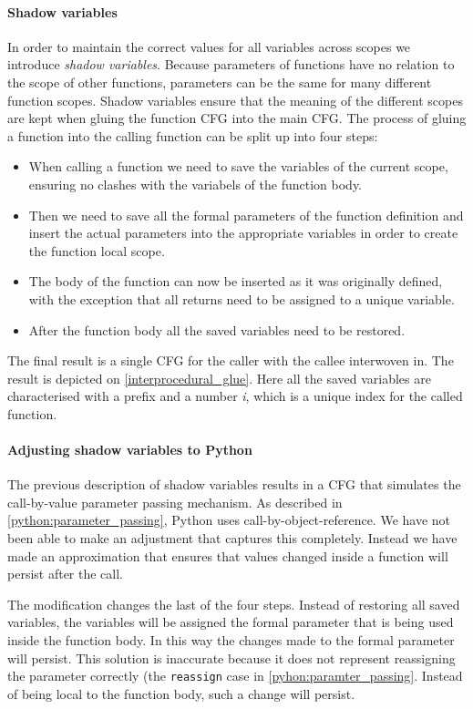 \paragraph{Shadow variables}
In order to maintain the correct values for all variables across scopes we introduce \emph{shadow variables}.
Because parameters of functions have no relation to the scope of other functions, parameters can be the same for many different function scopes.
Shadow variables ensure that the meaning of the different scopes are kept when gluing the function CFG into the main CFG.
The process of gluing a function into the calling function can be split up into four steps:
\begin{itemize}
\item When calling a function we need to save the variables of the current scope, ensuring no clashes with the variabels of the function body.
\item Then we need to save all the formal parameters of the function definition and insert the actual parameters into the appropriate variables in order to create the function local scope.
\item The body of the function can now be inserted as it was originally defined, with the exception that all returns need to be assigned to a unique variable.
\item After the function body all the saved variables need to be restored.
\end{itemize}

The final result is a single CFG for the caller with the callee interwoven in.
The result is depicted on \cref{interprocedural_glue}.
Here all the saved variables are characterised with a prefix and a number \emph{i}, which is a unique index for the called function.

\paragraph{Adjusting shadow variables to Python}
The previous description of shadow variables results in a CFG that simulates the call-by-value parameter passing mechanism.
As described in \cref{python:parameter_passing}, Python uses call-by-object-reference.
We have not been able to make an adjustment that captures this completely.
Instead we have made an approximation that ensures that values changed inside a function will persist after the call.

The modification changes the last of the four steps.
Instead of restoring all saved variables, the variables will be assigned the formal parameter that is being used inside the function body.
In this way the changes made to the formal parameter will persist.
This solution is inaccurate because it does not represent reassigning the parameter correctly (the \texttt{reassign} case in \cref{pyhon:paramter_passing}.
Instead of being local to the function body, such a change will persist.

